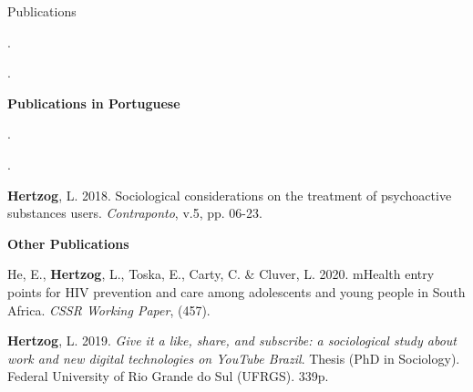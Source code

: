 \begin{rSection}{Publications}
\begin{etaremune}
\item {}. \href{https://doi.org/10.1080/13548506.2022.2108086}{\textcolor{mydoi}{\aiDoi}} 

\item {}. \href{https://doi.org/10.17159/sajs.2021/12290}{\textcolor{mydoi}{\aiDoi}} 

\vspace{1em}
{\large \textbf {Publications in Portuguese}}
\vspace{1em}

\item {}. \href{http://dx.doi.org/10.4322/2316-1329.135}{\textcolor{mydoi}{\aiDoi}} 

\item {}. \href{https://doi.org/10.21680/1982-1662.2019v2n26ID15946 }{\textcolor{mydoi}{\aiDoi}} 

\item \textbf{Hertzog}, L. 2018. Sociological considerations on the treatment of psychoactive substances users. \textit{Contraponto}, v.5, pp. 06-23. \href{https://seer.ufrgs.br/contraponto/article/download/85460/49139}{\textcolor{mydoi}{\aiDoi}}

\item {} \href{https://periodicos.ufpe.br/revistas/revsocio/article/download/243412/33791}{\textcolor{mydoi}{\aiDoi}} 

\item {} \href{https://doi.org/10.5433/2176-6665.2015v20n2p312}{\textcolor{mydoi}{\aiDoi}} 

\vspace{1em}
\large \textbf {Other Publications}
\vspace{1em}

\item He, E., \textbf{Hertzog}, L., Toska, E., Carty, C. \& Cluver, L. 2020. mHealth entry points for HIV prevention and care among adolescents and young people in South Africa. {\textit{CSSR Working Paper}}, (457). \href{https://humanities.uct.ac.za/sites/default/files/content_migration/humanities_uct_ac_za/1380/files/WP457HeHertzogToskaCartyCluver.pdf}{\textcolor{mydoi}{\aiDoi}} 

\item {\textbf{Hertzog}}, L. 2019. {\textit{Give it a like, share, and subscribe: a sociological study about work and new digital technologies on YouTube Brazil}}. Thesis (PhD in Sociology). Federal University of Rio Grande do Sul (UFRGS). 339p. \href{https://lume.ufrgs.br/handle/10183/197554}{\textcolor{mydoi}{\aiDoi}} 


\end{etaremune}
\end{rSection}
